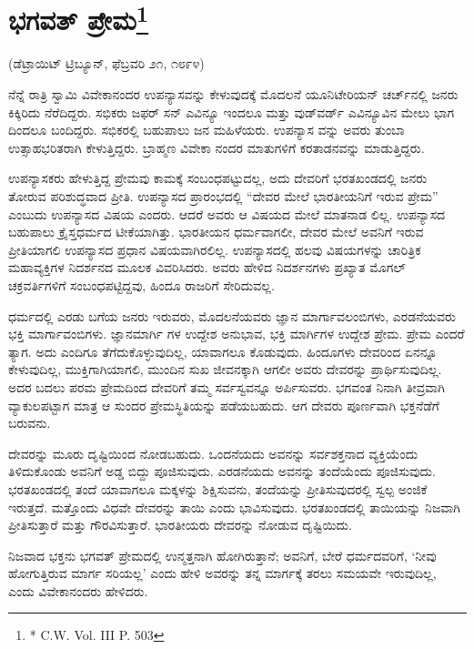 \delimiter


\section{ಭಗವತ್ ಪ್ರೇಮ\protect\footnote{* C.W. Vol. III P. 503}}

\begin{center}
(ಡೆಟ್ರಾಯಿಟ್​ ಟ್ರಿಬ್ಯೂನ್​, ಫೆಬ್ರವರಿ ೨೧, ೧೮೯೪)
\end{center}

ನೆನ್ನೆ ರಾತ್ರಿ ಸ್ವಾಮಿ ವಿವೇಕಾನಂದರ ಉಪನ್ಯಾಸವನ್ನು ಕೇಳುವುದಕ್ಕೆ ಮೊದಲನೆ ಯೂನಿಟೇರಿಯನ್​ ಚರ್ಚ್​ನಲ್ಲಿ ಜನರು ಕಿಕ್ಕಿರಿದು ನೆರೆದಿದ್ದರು. ಸಭಿಕರು ಜಫರ್​ ಸನ್​ ಎವಿನ್ಯೂ ಇಂದಲೂ ಮತ್ತು ವುಡ್​ವರ್ಡ್​ ಎವಿನ್ಯೂವಿನ ಮೇಲು ಭಾಗ ದಿಂದಲೂ ಬಂದಿದ್ದರು. ಸಭಿಕರಲ್ಲಿ ಬಹುಪಾಲು ಜನ ಮಹಿಳೆಯರು. ಉಪನ್ಯಾಸ ವನ್ನು ಅವರು ತುಂಬಾ ಉತ್ಸಾಹಭರಿತರಾಗಿ ಕೇಳುತ್ತಿದ್ದರು. ಬ್ರಾಹ್ಮಣ ವಿವೇಕಾ ನಂದರ ಮಾತುಗಳಿಗೆ ಕರತಾಡನವನ್ನು ಮಾಡುತ್ತಿದ್ದರು.

ಉಪನ್ಯಾಸಕರು ಹೇಳುತ್ತಿದ್ದ ಪ್ರೇಮವು ಕಾಮಕ್ಕೆ ಸಂಬಂಧಪಟ್ಟುದಲ್ಲ, ಅದು ದೇವರಿಗೆ ಭರತಖಂಡದಲ್ಲಿ ಜನರು ತೋರುವ ಪರಿಶುದ್ಧವಾದ ಪ್ರೀತಿ. ಉಪನ್ಯಾಸದ ಪ್ರಾರಂಭದಲ್ಲಿ “ದೇವರ ಮೇಲೆ ಭಾರತೀಯನಿಗೆ ಇರುವ ಪ್ರೇಮ” ಎಂಬುದು ಉಪನ್ಯಾಸದ ವಿಷಯ ಎಂದರು. ಆದರೆ ಅವರು ಆ ವಿಷಯದ ಮೇಲೆ ಮಾತನಾಡ ಲಿಲ್ಲ. ಉಪನ್ಯಾಸದ ಬಹುಪಾಲು ಕ್ರೈಸ್ತಧರ್ಮದ ಟೀಕೆಯಾಗಿತ್ತು. ಭಾರತೀಯನ ಧರ್ಮವಾಗಲೀ, ದೇವರ ಮೇಲೆ ಅವನಿಗೆ ಇರುವ ಪ್ರೀತಿಯಾಗಲಿ ಉಪನ್ಯಾಸದ ಪ್ರಧಾನ ವಿಷಯವಾಗಿರಲಿಲ್ಲ. ಉಪನ್ಯಾಸದಲ್ಲಿ ಹಲವು ವಿಷಯಗಳನ್ನು ಚಾರಿತ್ರಿಕ ಮಹಾವ್ಯಕ್ತಿಗಳ ನಿದರ್ಶನದ ಮೂಲಕ ವಿವರಿಸಿದರು. ಅವರು ಹೇಳಿದ ನಿದರ್ಶನಗಳು ಪ್ರಖ್ಯಾತ ಮೊಗಲ್​ ಚಕ್ರವರ್ತಿಗಳಿಗೆ ಸಂಬಂಧಪಟ್ಟಿದ್ದವು, ಹಿಂದೂ ರಾಜರಿಗೆ ಸೇರಿದುವಲ್ಲ.

ಧರ್ಮದಲ್ಲಿ ಎರಡು ಬಗೆಯ ಜನರು ಇರುವರು, ಮೊದಲನೆಯವರು ಜ್ಞಾನ ಮಾರ್ಗಾವಲಂಬಿಗಳು, ಎರಡನೆಯವರು ಭಕ್ತಿ ಮಾರ್ಗಾವಂಬಿಗಳು. ಜ್ಞಾನಮಾರ್ಗಿ ಗಳ ಉದ್ದೇಶ ಅನುಭಾವ, ಭಕ್ತಿ ಮಾರ್ಗಿಗಳ ಉದ್ದೇಶ ಪ್ರೇಮ. ಪ್ರೇಮ ಎಂದರೆ ತ್ಯಾಗ. ಅದು ಎಂದಿಗೂ ತೆಗೆದುಕೊಳ್ಳುವುದಿಲ್ಲ, ಯಾವಾಗಲೂ ಕೊಡುವುದು. ಹಿಂದೂಗಳು ದೇವರಿಂದ ಏನನ್ನೂ ಕೇಳುವುದಿಲ್ಲ, ಮುಕ್ತಿಗಾಗಿಯಾಗಲಿ, ಮುಂದಿನ ಸುಖ ಜೀವನಕ್ಕಾಗಿ ಆಗಲೀ ಅವರು ದೇವರನ್ನು ಪ್ರಾರ್ಥಿಸುವುದಿಲ್ಲ. ಅದರ ಬದಲು ಪರಮ ಪ್ರೇಮದಿಂದ ದೇವರಿಗೆ ತಮ್ಮ ಸರ್ವಸ್ವವನ್ನೂ ಅರ್ಪಿಸುವರು. ಭಗವಂತ ನಿನಾಗಿ ತೀವ್ರವಾಗಿ ವ್ಯಾಕುಲಪಟ್ಟಾಗ ಮಾತ್ರ ಆ ಸುಂದರ ಪ್ರೇಮಸ್ಥಿತಿಯನ್ನು ಪಡೆಯಬಹುದು. ಆಗ ದೇವರು ಪೂರ್ಣವಾಗಿ ಭಕ್ತನೆಡೆಗೆ ಬರುವನು.

ದೇವರನ್ನು ಮೂರು ದೃಷ್ಟಿಯಿಂದ ನೋಡಬಹುದು. ಒಂದನೆಯದು ಅವನನ್ನು ಸರ್ವಶಕ್ತನಾದ ವ್ಯಕ್ತಿಯೆಂದು ತಿಳಿದುಕೊಂಡು ಅವನಿಗೆ ಅಡ್ಡ ಬಿದ್ದು ಪೂಜಿಸುವುದು. ಎರಡನೆಯದು ಅವನನ್ನು ತಂದೆಯೆಂದು ಪೂಜಿಸುವುದು. ಭರತಖಂಡದಲ್ಲಿ ತಂದೆ ಯಾವಾಗಲೂ ಮಕ್ಕಳನ್ನು ಶಿಕ್ಷಿಸುವನು, ತಂದೆಯನ್ನು ಪ್ರೀತಿಸುವುದರಲ್ಲಿ ಸ್ವಲ್ಪ ಅಂಜಿಕೆ ಇರುತ್ತದೆ. ಮತ್ತೊಂದು ವಿಧವೇ ದೇವರನ್ನು ತಾಯಿ ಎಂದು ಭಾವಿಸುವುದು. ಭರತಖಂಡದಲ್ಲಿ ತಾಯಿಯನ್ನು ನಿಜವಾಗಿ ಪ್ರೀತಿಸುತ್ತಾರೆ ಮತ್ತು ಗೌರವಿಸುತ್ತಾರೆ. ಭಾರತೀಯರು ದೇವರನ್ನು ನೋಡುವ ದೃಷ್ಟಿಯಿದು.

ನಿಜವಾದ ಭಕ್ತನು ಭಗವತ್​ ಪ್ರೇಮದಲ್ಲಿ ಉನ್ಮತ್ತನಾಗಿ ಹೋಗಿರುತ್ತಾನೆ; ಅವನಿಗೆ, ಬೇರೆ ಧರ್ಮದವರಿಗೆ, ‘ನೀವು ಹೋಗುತ್ತಿರುವ ಮಾರ್ಗ ಸರಿಯಲ್ಲ’ ಎಂದು ಹೇಳಿ ಅವರನ್ನು ತನ್ನ ಮಾರ್ಗಕ್ಕೆ ತರಲು ಸಮಯವೇ ಇರುವುದಿಲ್ಲ, ಎಂದು ವಿವೇಕಾನಂದರು ಹೇಳಿದರು.

